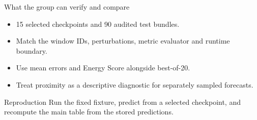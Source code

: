 \documentclass[aspectratio=169,11pt]{beamer}
\begin{document}
\begin{frame}{What the group can verify and compare}
\begin{itemize}
\item 15 selected checkpoints and 90 audited test bundles.
\item Match the window IDs, perturbations, metric evaluator and runtime boundary.
\item Use mean errors and Energy Score alongside best-of-20.
\item Treat proximity as a descriptive diagnostic for separately sampled forecasts.
\end{itemize}
\begin{block}{Reproduction}
Run the fixed fixture, predict from a selected checkpoint, and recompute the
main table from the stored predictions.
\end{block}
\end{frame}
\end{document}
